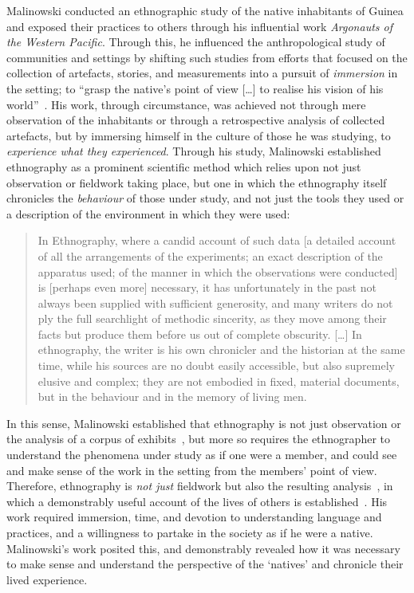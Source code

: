 \begin{revisedsubmission}
Malinowski conducted an ethnographic study of the native inhabitants of Guinea and exposed their practices to others through his influential work \textit{Argonauts of the Western Pacific}.
Through this, he influenced the anthropological study of communities and settings by shifting such studies from efforts that focused on the collection of artefacts, stories, and measurements into a pursuit of \textit{immersion} in the setting; to ``grasp the native’s point of view [\ldots] to realise his vision of his world''~\citep[p. 25]{Malinowski1922}.
His work, through circumstance, was achieved not through mere observation of the inhabitants or through a retrospective analysis of collected artefacts, but by immersing himself in the culture of those he was studying, to \textit{experience what they experienced}.
Through his study, Malinowski established ethnography as a prominent scientific method which relies upon not just observation or fieldwork taking place, but one in which the ethnography itself chronicles the \textit{behaviour} of those under study, and not just the tools they used or a description of the environment in which they were used:
\begin{quote}
    In Ethnography, where a candid account of such data [a detailed account of all the arrangements of the experiments; an exact description of the apparatus used; of the manner in which the observations were conducted] is [perhaps even more] necessary, it has unfortunately in the past not always been supplied with sufficient generosity, and many writers do not ply the full searchlight of methodic sincerity, as they move among their facts but produce them before us out of complete obscurity. [\ldots] In ethnography, the writer is his own chronicler and the historian at the same time, while his sources are no doubt easily accessible, but also supremely elusive and complex; they are not embodied in fixed, material documents, but in the behaviour and in the memory of living men.
\end{quote}
In this sense, Malinowski established that ethnography is not just observation or the analysis of a corpus of exhibits~\citep{Bittner1973}, but more so requires the ethnographer to understand the phenomena under study as if one were a member, and could see and make sense of the work in the setting from the members' point of view.
Therefore, ethnography is \textit{not just} fieldwork but also the resulting analysis~\citep{Anderson1997}, in which a demonstrably useful account of the lives of others is established~\citep{Button2000,Crabtree2012}.
His work required immersion, time, and devotion to understanding language and practices, and a willingness to partake in the society as if he were a native.
Malinowski's work posited this, and demonstrably revealed how it was necessary to make sense and understand the perspective of the `natives' and chronicle their lived experience.


\end{revisedsubmission}
